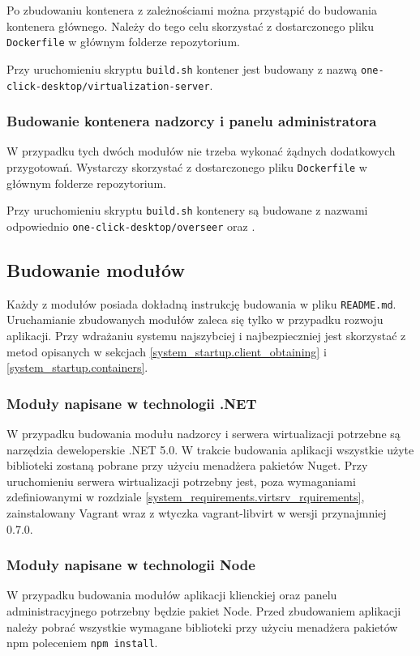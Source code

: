 \documentclass[../opis-rozwiazania.tex]{subfiles}
\begin{document}
Po zbudowaniu kontenera z zależnościami można przystąpić do budowania kontenera głównego.
Należy do tego celu skorzystać z dostarczonego pliku \texttt{Dockerfile} w głównym folderze repozytorium.

Przy uruchomieniu skryptu \texttt{build.sh} kontener jest budowany z nazwą \texttt{one-click-desktop/virtualization-server}.

\subsubsection{Budowanie kontenera nadzorcy i panelu administratora}
W przypadku tych dwóch modułów nie trzeba wykonać żądnych dodatkowych przygotowań.
Wystarczy skorzystać z dostarczonego pliku \texttt{Dockerfile} w głównym folderze repozytorium.

Przy uruchomieniu skryptu \texttt{build.sh} kontenery są budowane z nazwami odpowiednio \texttt{one-click-desktop/overseer} oraz \texttt{}.

\subsection{Budowanie modułów}
Każdy z modułów posiada dokładną instrukcję budowania w pliku \texttt{README.md}.
Uruchamianie zbudowanych modułów zaleca się tylko w przypadku rozwoju aplikacji.
Przy wdrażaniu systemu najszybciej i najbezpieczniej jest skorzystać z metod opisanych w sekcjach \ref{system_startup.client_obtaining} i \ref{system_startup.containers}.

\subsubsection{Moduły napisane w technologii .NET}
W przypadku budowania modułu nadzorcy i serwera wirtualizacji potrzebne są narzędzia deweloperskie .NET 5.0.
W trakcie budowania aplikacji wszystkie użyte biblioteki zostaną pobrane przy użyciu menadżera pakietów Nuget.
Przy uruchomieniu serwera wirtualizacji potrzebny jest, poza wymaganiami zdefiniowanymi w rozdziale \ref{system_requirements.virtsrv_rquirements}, zainstalowany Vagrant wraz z wtyczka vagrant-libvirt w wersji przynajmniej 0.7.0.

\subsubsection{Moduły napisane w technologii Node}
W przypadku budowania modułów aplikacji klienckiej oraz panelu administracyjnego potrzebny będzie pakiet Node. Przed zbudowaniem aplikacji należy pobrać wszystkie wymagane biblioteki przy użyciu menadżera pakietów npm poleceniem \texttt{npm install}.
\end{document}
